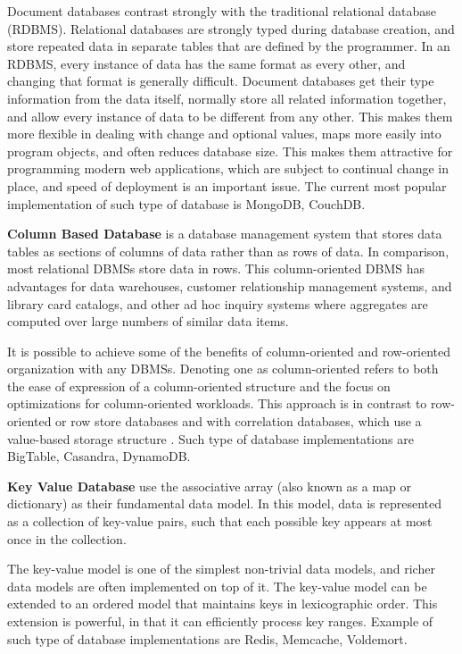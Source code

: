 Document databases contrast strongly with the traditional relational database (RDBMS). Relational databases are strongly typed during database creation, and store repeated data in separate tables that are defined by the programmer. In an RDBMS, every instance of data has the same format as every other, and changing that format is generally difficult. Document databases get their type information from the data itself, normally store all related information together, and allow every instance of data to be different from any other. This makes them more flexible in dealing with change and optional values, maps more easily into program objects, and often reduces database size. This makes them attractive for programming modern web applications, which are subject to continual change in place, and speed of deployment is an important issue. The current most popular implementation of such type of database is MongoDB, CouchDB.

\textbf{Column Based Database} is a database management system that stores data tables as sections of columns of data rather than as rows of data. In comparison, most relational DBMSs store data in rows. This column-oriented DBMS has advantages for data warehouses, customer relationship management systems, and library card catalogs, and other ad hoc inquiry systems where aggregates are computed over large numbers of similar data items.

It is possible to achieve some of the benefits of column-oriented and row-oriented organization with any DBMSs. Denoting one as column-oriented refers to both the ease of expression of a column-oriented structure and the focus on optimizations for column-oriented workloads. This approach is in contrast to row-oriented or row store databases and with correlation databases, which use a value-based storage structure \cite{wiki_column_based_db}. Such type of database implementations are BigTable, Casandra, DynamoDB.

\textbf{Key Value Database} use the associative array (also known as a map or dictionary) as their fundamental data model. In this model, data is represented as a collection of key-value pairs, such that each possible key appears at most once in the collection.

The key-value model is one of the simplest non-trivial data models, and richer data models are often implemented on top of it. The key-value model can be extended to an ordered model that maintains keys in lexicographic order. This extension is powerful, in that it can efficiently process key ranges. Example of such type of database implementations are Redis, Memcache, Voldemort.

